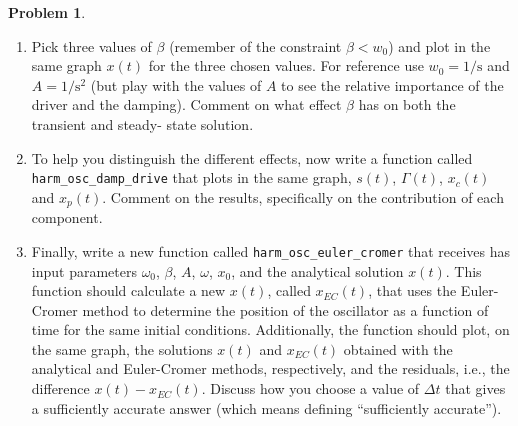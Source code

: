 \documentclass[10pt]{article}
\theoremstyle{definition}
\newtheorem{problem}{Problem}
\begin{document}
\begin{problem}
\begin{enumerate}[label=(\alph*)]
      \item Pick three values of $\beta$ (remember of the constraint $\beta<w_0$) and plot in the same graph $x(t)$ for the three
            chosen values. For reference use $w_0=1\unit{\per\second}$ and $A=1\unit{\per\second\squared}$ (but play with the values of $A$ to see the relative
            importance of the driver and the damping). Comment on what effect $\beta$ has on both the transient and steady- state solution.

      \item To help you distinguish the different effects, now write a function called \verb|harm_osc_damp_drive| that plots
            in the same graph, $s(t)$, $\Gamma(t)$, $x_c(t)$ and $x_p(t)$. Comment on the results, specifically on the contribution of each component.

      \item Finally, write a new function called \verb|harm_osc_euler_cromer| that receives has input parameters $\omega_0$, $\beta$,
            $A$, $\omega$, $x_0$, and the analytical solution $x(t)$. This function should calculate a new $x(t)$, called $x_{EC}(t)$, that uses
            the Euler-Cromer method to determine the position of the oscillator as a function of time for the same initial conditions. Additionally, the function should
            plot, on the same graph, the solutions $x(t)$ and $x_{EC}(t)$ obtained with the analytical and Euler-Cromer methods, respectively, and the residuals, i.e.,
            the difference $x(t)-x_{EC}(t)$. Discuss how you choose a value of $\Delta t$ that gives a sufficiently accurate answer (which means defining
            ``sufficiently accurate'').
\end{enumerate}
\end{problem}
\end{document}
